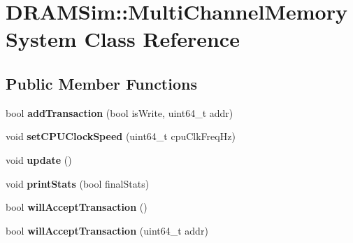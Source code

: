 \hypertarget{classDRAMSim_1_1MultiChannelMemorySystem}{\section{D\-R\-A\-M\-Sim\-:\-:Multi\-Channel\-Memory\-System Class Reference}
\label{classDRAMSim_1_1MultiChannelMemorySystem}
}
\subsection*{Public Member Functions}
\begin{DoxyCompactItemize}
\item 
\hypertarget{classDRAMSim_1_1MultiChannelMemorySystem_a72220fb1d4d14e98a30c7291bfaefe41}{bool {\bfseries add\-Transaction} (bool is\-Write, uint64\-\_\-t addr)}\label{classDRAMSim_1_1MultiChannelMemorySystem_a72220fb1d4d14e98a30c7291bfaefe41}

\item 
\hypertarget{classDRAMSim_1_1MultiChannelMemorySystem_ac524325928d506401ea67b172c7683ac}{void {\bfseries set\-C\-P\-U\-Clock\-Speed} (uint64\-\_\-t cpu\-Clk\-Freq\-Hz)}\label{classDRAMSim_1_1MultiChannelMemorySystem_ac524325928d506401ea67b172c7683ac}

\item 
\hypertarget{classDRAMSim_1_1MultiChannelMemorySystem_a806aa6b36ddf2890af05832095edbce3}{void {\bfseries update} ()}\label{classDRAMSim_1_1MultiChannelMemorySystem_a806aa6b36ddf2890af05832095edbce3}

\item 
\hypertarget{classDRAMSim_1_1MultiChannelMemorySystem_a8e5561dda95751ac1edf70c0bcccb0e0}{void {\bfseries print\-Stats} (bool final\-Stats)}\label{classDRAMSim_1_1MultiChannelMemorySystem_a8e5561dda95751ac1edf70c0bcccb0e0}

\item 
\hypertarget{classDRAMSim_1_1MultiChannelMemorySystem_a21501d2af9f8b878785285904b86df3d}{bool {\bfseries will\-Accept\-Transaction} ()}\label{classDRAMSim_1_1MultiChannelMemorySystem_a21501d2af9f8b878785285904b86df3d}

\item 
\hypertarget{classDRAMSim_1_1MultiChannelMemorySystem_ad754dc52ca5dcf9f040ffd931400a08b}{bool {\bfseries will\-Accept\-Transaction} (uint64\-\_\-t addr)}\label{classDRAMSim_1_1MultiChannelMemorySystem_ad754dc52ca5dcf9f040ffd931400a08b}


\end{DoxyCompactItemize}

